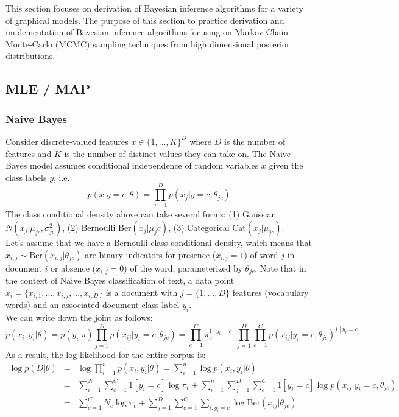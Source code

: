This section focuses on derivation of Bayesian inference algorithms for a variety of graphical models. The purpose of this section to practice derivation and implementation of Bayesian inference algorithms focusing on Markov-Chain Monte-Carlo (MCMC) sampling techniques from high dimensional posterior distributions. 


\subsection{MLE / MAP}
\subsubsection{Naive Bayes}
Consider discrete-valued features $x \in \{1,...,K\}^{D}$ where $D$ is the number of features and $K$ is the number of distinct values they can take on. The Naive Bayes model assumes conditional independence of random variables $x$ given the class labels $y$, i.e.
\begin{equation}
    p(x|y=c, \theta) = \prod_{j=1}^{D} p(x_j|y=c, \theta_{jc})
\end{equation}
The class conditional density above can take several forms: (1) Gaussian $N(x_j|\mu_{jc}, \sigma_{jc}^{2})$, (2) Bernoulli $\mathrm{Ber}(x_j|\mu_jc)$, (3) Categorical $\mathrm{Cat}(x_j|\mu_{jc})$.\\

Let's assume that we have a Bernoulli class conditional density, which means that $x_{i,j} \sim \mathrm{Ber}(x_{i,j}|\theta_{jc})$ are binary indicators for presence ($x_{i,j} = 1$) of word $j$ in document $i$ or absence ($x_{i,j} = 0$) of the word, parameterized by $\theta_{jc}$. Note that in the context of Naive Bayes classification of text, a data point $x_i = \{x_{i,1},...,x_{i,j},...,x_{i,D}\}$ is a document with $j=\{1,...,D\}$ features (vocabulary words) and an associated document class label $y_i$.\\

We can write down the joint as follows:
\begin{equation}
    p(x_i, y_i|\theta) = p(y_i|\pi) \prod_{j=1}^{D}p(x_{ij}|y_i=c,\theta_{jc}) = \prod_{c=1}^{C}\pi_{c}^{1[y_i = c]} \prod_{j=1}^{D}\prod_{c=1}^{C}p(x_{ij}|y_i=c,\theta_{jc})^{1[y_i = c]}
\end{equation}
As a result, the log-likelihood for the entire corpus is:
\begin{eqnarray}
    \log p(D|\theta) &=& \log \prod_{i=1}^{n} p(x_i, y_i|\theta) = \sum_{i=1}^{n} \log p(x_i, y_i|\theta) \nonumber \\
&=& \sum_{i=1}^{N}\sum_{c=1}^{C}1[y_i = c]\log \pi_c + \sum_{i=1}^{n}\sum_{j=1}^{D}\sum_{c=1}^{C}1[y_i = c]\log p(x_{ij}|y_i = c, \theta_{jc}) \nonumber \\
&=& \sum_{c=1}^{C}N_c \log \pi_c + \sum_{j=1}^{D} \sum_{c=1}^{C}\sum_{i:y_i = c} \log \mathrm{Ber}(x_{ij}|\theta_{jc}) 
\end{eqnarray}

